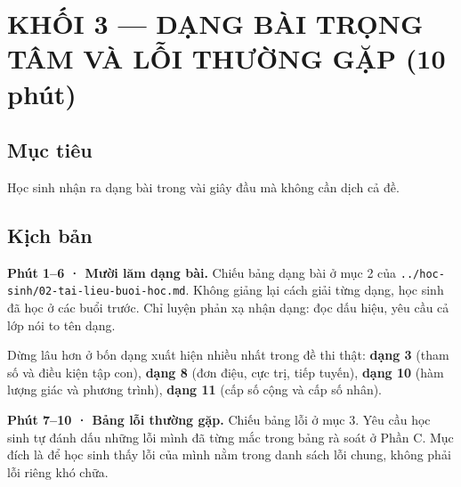 \documentclass[11pt, a4paper]{article}
\begin{document}

\section{KHỐI 3 — DẠNG BÀI TRỌNG TÂM VÀ LỖI THƯỜNG GẶP (10 phút)}

\subsection{Mục tiêu}

Học sinh nhận ra dạng bài trong vài giây đầu mà không cần dịch cả đề.

\subsection{Kịch bản}

\textbf{Phút 1–6 · Mười lăm dạng bài.} Chiếu bảng dạng bài ở mục 2 của \texttt{../hoc-sinh/02-tai-lieu-buoi-hoc.md}. Không giảng lại cách giải từng dạng, học sinh đã học ở các buổi trước. Chỉ luyện phản xạ nhận dạng: đọc dấu hiệu, yêu cầu cả lớp nói to tên dạng.

Dừng lâu hơn ở bốn dạng xuất hiện nhiều nhất trong đề thi thật: \textbf{dạng 3} (tham số và điều kiện tập con), \textbf{dạng 8} (đơn điệu, cực trị, tiếp tuyến), \textbf{dạng 10} (hàm lượng giác và phương trình), \textbf{dạng 11} (cấp số cộng và cấp số nhân).

\textbf{Phút 7–10 · Bảng lỗi thường gặp.} Chiếu bảng lỗi ở mục 3. Yêu cầu học sinh tự đánh dấu những lỗi mình đã từng mắc trong bảng rà soát ở Phần C. Mục đích là để học sinh thấy lỗi của mình nằm trong danh sách lỗi chung, không phải lỗi riêng khó chữa.
\end{document}
